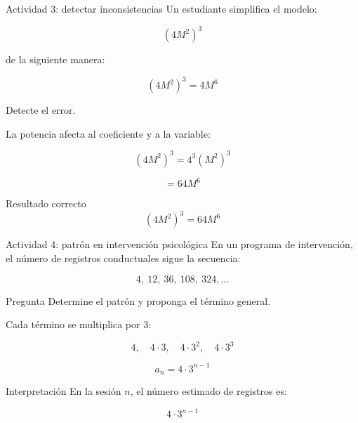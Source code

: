 \documentclass[handout,aspectratio=169]{beamer}
\begin{document}
	
	\begin{frame}{Actividad 3: detectar inconsistencias}
		Un estudiante simplifica el modelo:
		
		\[
		(4M^2)^3
		\]
		
		de la siguiente manera:
		
		\[
		(4M^2)^3=4M^6
		\]
		
		\pause
		
		\begin{alerta}
			Detecte el error.
		\end{alerta}
		
		\pause
		
		La potencia afecta al coeficiente y a la variable:
		
		\[
		(4M^2)^3=4^3(M^2)^3
		\]
		
		\[
		=64M^6
		\]
		
		\pause
		
		\begin{block}{Resultado correcto}
			\[
			(4M^2)^3=64M^6
			\]
		\end{block}
	\end{frame}
	
	
	\begin{frame}{Actividad 4: patrón en intervención psicológica}
		En un programa de intervención, el número de registros conductuales sigue la secuencia:
		
		\[
		4,\ 12,\ 36,\ 108,\ 324,\ldots
		\]
		
		\pause
		
		\begin{block}{Pregunta}
			Determine el patrón y proponga el término general.
		\end{block}
		
		\pause
		
		Cada término se multiplica por \(3\):
		
		\[
		4,\quad 4\cdot3,\quad 4\cdot3^2,\quad 4\cdot3^3
		\]
		
		\pause
		
		\[
		a_n=4\cdot3^{n-1}
		\]
		
		\pause
		
		\begin{block}{Interpretación}
			En la sesión \(n\), el número estimado de registros es:
			
			\[
			4\cdot3^{n-1}
			\]
		\end{block}
	\end{frame}
	
\end{document}
